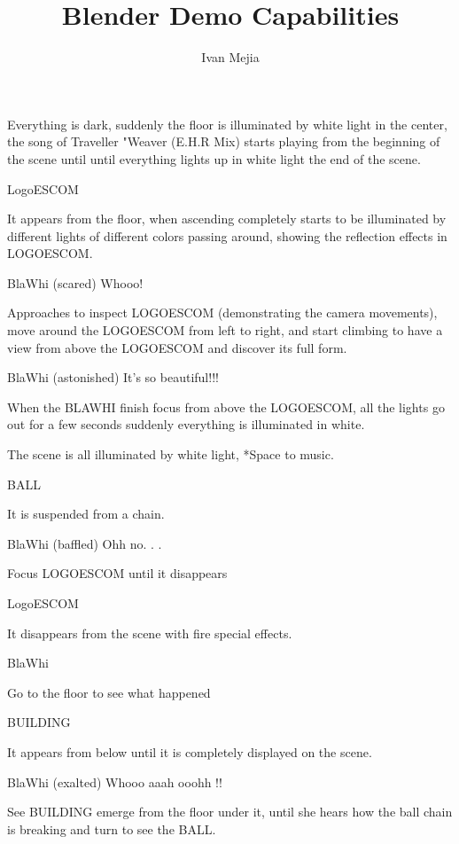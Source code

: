 \documentclass{screenplay}[2012/06/30]
\title{Blender Demo Capabilities}
\author{Ivan Mejia}
\begin{document}
\coverpage
\fadein

\textbf{}
Everything is dark, suddenly the floor is illuminated by white light in the center, the song of Traveller
"Weaver (E.H.R Mix) starts playing from the beginning of the scene until until everything lights up in white light
the end of the scene.
\begin{dialogue}{LogoESCOM}
\end{dialogue}
It appears from the floor, when ascending completely starts to be illuminated by different lights of different colors passing around, showing the reflection effects in LOGOESCOM.

\begin{dialogue}{BlaWhi}
(scared) Whooo!
\end{dialogue}

Approaches to inspect LOGOESCOM (demonstrating the camera movements),  move around the LOGOESCOM from left to right, and start climbing to have a view from above the LOGOESCOM and discover its full form.
\begin{dialogue}{BlaWhi}
(astonished) It's so beautiful!!!
\end{dialogue}
When the BLAWHI finish focus from above the LOGOESCOM, all the lights go out for a few seconds suddenly everything is illuminated in white.

\textbf{}
The scene is all illuminated by white light, *Space to music.
\begin{dialogue}{BALL}
\end{dialogue}
It is suspended from a chain.
\begin{dialogue}{BlaWhi}
(baffled) Ohh no. . .
\end{dialogue}
Focus LOGOESCOM until it disappears
\begin{dialogue}{LogoESCOM}
\end{dialogue}
It disappears from the scene with fire special effects.
\begin{dialogue}{BlaWhi}
\end{dialogue}
Go to the floor to see what happened
\begin{dialogue}{BUILDING}
\end{dialogue}
It appears from below until it is completely displayed on the scene.
\begin{dialogue}{BlaWhi}
(exalted) Whooo aaah ooohh !!
\end{dialogue}
See BUILDING emerge from the floor under it, until she hears how the ball chain is breaking and turn to see the BALL.
\end{document}
